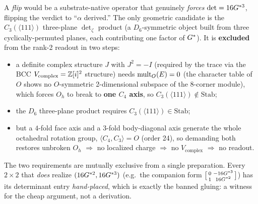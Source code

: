  A \emph{flip} would be a
substrate-native operator that genuinely \emph{forces} $\det=16G^{*3}$, flipping
the verdict to ``$\alpha$ derived.'' The only geometric candidate is the
$C_3(\langle111\rangle)$ three-plane $\det_\zeta$ product (a $D_6$-symmetric
object built from three cyclically-permuted planes, each contributing one factor
of $G^{*}$). It is \textbf{excluded} from the rank-2 readout in two steps:
\begin{itemize}[leftmargin=1.4em, itemsep=2pt]
  \item a definite complex structure $J$ with $J^2=-I$ (required by the
        trace via the BCC $V_{\mathrm{complex}}=\mathbb{Z}[i]^2$ structure) needs
        $\operatorname{mult}_O(E)=0$ (the character table of $O$ shows no $O$-symmetric
        2-dimensional subspace of the 8-corner module), which forces $O_h$ to
        break to \textbf{one $C_4$ axis}, so $C_3(\langle111\rangle)\notin\mathrm{Stab}$;
  \item the $D_6$ three-plane product requires
        $C_3(\langle111\rangle)\in\mathrm{Stab}$;
  \item but a $4$-fold face axis and a $3$-fold body-diagonal axis generate the
        whole octahedral rotation group, $\langle C_4, C_3\rangle = O$ (order
        24), so demanding both restores unbroken $O_h$ $\Rightarrow$ no localized
        charge $\Rightarrow$ no $V_{\mathrm{complex}}$ $\Rightarrow$ no readout.
\end{itemize}
The two requirements are mutually exclusive from a single preparation. Every
$2\times2$ that \emph{does} realize $(16G^{*2},16G^{*3})$ (e.g.\ the companion
form $\bigl[\begin{smallmatrix}0 & -16G^{*3}\\ 1 & 16G^{*2}\end{smallmatrix}\bigr]$) has
its determinant entry \emph{hand-placed}, which is exactly the banned gluing: a
witness for the cheap argument, not a derivation.

